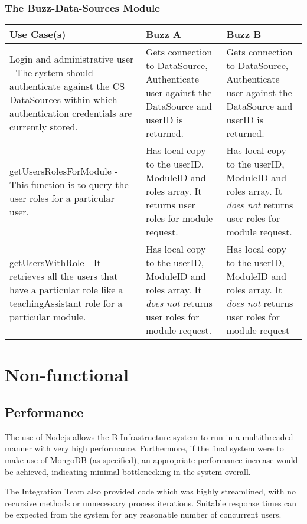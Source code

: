 \documentclass[12pt]{article}
\begin{document}
\subsubsection{The Buzz-Data-Sources Module}%
\begin{tabular}{|p{4.5cm}|p{4.5cm}|p{4.5cm}|}

\hline
Use Case(s) & Buzz A & Buzz B \\ 
\hline
Login and administrative user - The system should authenticate against the CS DataSources within which authentication credentials are currently stored. & Gets connection to DataSource, Authenticate user against the DataSource and userID is returned. & Gets connection to DataSource, Authenticate user against the DataSource and userID is returned.\\ %
\hline
getUsersRolesForModule - This function is to query the user roles for a particular user. & Has local copy to the userID, ModuleID and roles array. It returns user roles for module request. & Has local copy to the userID, ModuleID and roles array. It \emph{does not} returns user roles for module request.\\ %
\hline
getUsersWithRole - It retrieves all the users that have a particular role like a teachingAssistant role for a particular module. & Has local copy to the userID, ModuleID and roles array. It \emph{does not} returns user roles for module request. & Has local copy to the userID, ModuleID and roles array. It \emph{does not} returns user roles for module request\\ %
\hline

\end{tabular}


\section{Non-functional} %
\subsection{Performance}
The use of Nodejs allows the B Infrastructure system to run in a multithreaded manner with very high performance. Furthermore, if the final system were to make use of MongoDB (as specified), an appropriate performance increase would be achieved, indicating minimal-bottlenecking in the system overall.

The Integration Team also provided code which was highly streamlined, with no recursive methods or unnecessary process iterations. Suitable response times can be expected from the system for any reasonable number of concurrent users.
\end{document}
